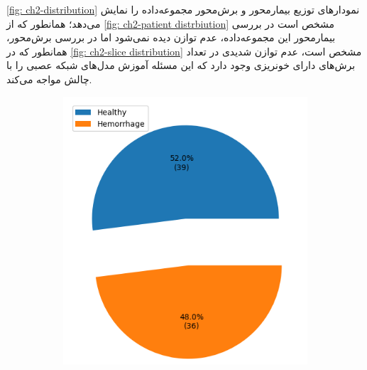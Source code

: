 \autoref{fig: ch2-distribution}
نمودارهای توزیع بیمارمحور و برش‌محور مجموعه‌داده را نمایش می‌دهد؛ همانطور که از ‎\autoref{fig: ch2-patient distrbiution}‎ مشخص است در بررسی بیمار‌محور این مجموعه‌داده، عدم توازن دیده نمی‌شود اما در بررسی برش‌محور، همانطور که در ‎\autoref{fig: ch2-slice distribution}‎ 
مشخص است، عدم توازن شدیدی در تعداد برش‌های دارای خونریزی وجود دارد که این مسئله آموزش مدل‌های شبکه عصبی را با چالش مواجه می‌کند.
 \begin{figure}[ht]
		\centering %
		\begin{subfigure}{0.45\textwidth}
			\includegraphics[width=\linewidth]{Images/Chapter2/patient distrbiution.png}
			\caption{}
			\label{fig: ch2-patient distrbiution}
		\end{subfigure}\hfil %
		\begin{subfigure}{0.45\textwidth}

\end{subfigure}
\end{figure}
